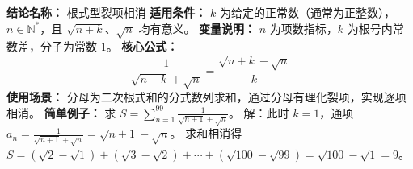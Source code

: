 \textbf{结论名称：} 根式型裂项相消
\textbf{适用条件：} \(k\) 为给定的正常数（通常为正整数），\(n\in\mathbb{N}^*\)，且 \(\sqrt{n+k}\)、\(\sqrt{n}\) 均有意义。
\textbf{变量说明：} \(n\) 为项数指标，\(k\) 为根号内常数差，分子为常数 \(1\)。
\textbf{核心公式：} 
\[
\boxed{\frac{1}{\sqrt{n+k}+\sqrt{n}} = \frac{\sqrt{n+k}-\sqrt{n}}{k}}
\]
\textbf{使用场景：} 分母为二次根式和的分式数列求和，通过分母有理化裂项，实现逐项相消。
\textbf{简单例子：} 求 \(\displaystyle S=\sum_{n=1}^{99}\frac{1}{\sqrt{n+1}+\sqrt{n}}\)。
解：此时 \(k=1\)，通项 \(a_n=\frac{1}{\sqrt{n+1}+\sqrt{n}}=\sqrt{n+1}-\sqrt{n}\)。
求和相消得 \(S=(\sqrt{2}-\sqrt{1})+(\sqrt{3}-\sqrt{2})+\cdots+(\sqrt{100}-\sqrt{99})=\sqrt{100}-\sqrt{1}=9\)。